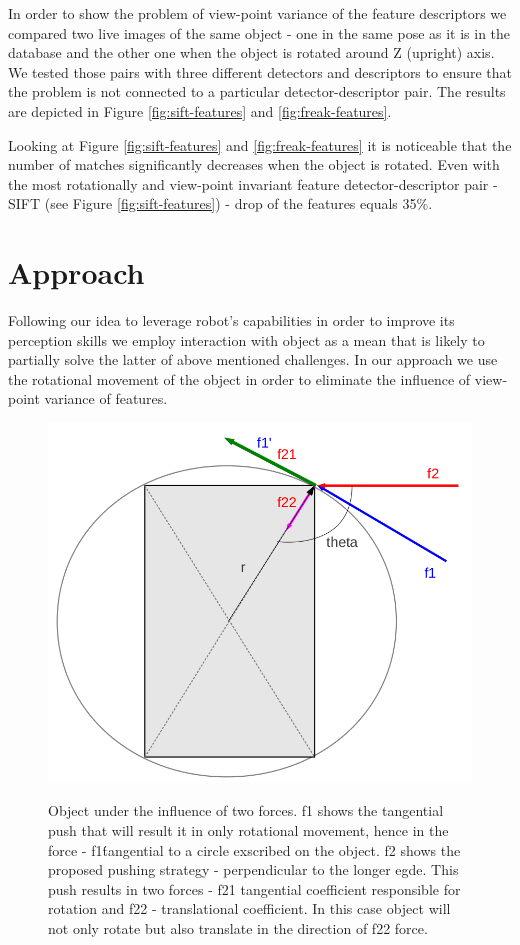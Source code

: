 In order to show the problem of view-point variance of the feature descriptors we compared two live images of the same object - one in the same pose as it is in the database and the other one when the object is rotated around Z (upright) axis. We tested those pairs with three different detectors and descriptors to ensure that the problem is not connected to a particular detector-descriptor pair. The results are depicted in Figure \ref{fig:sift-features} and \ref{fig:freak-features}.%

Looking at Figure \ref{fig:sift-features} and \ref{fig:freak-features} it is noticeable that the number of matches significantly decreases when the object is rotated. Even with the most rotationally and view-point invariant feature detector-descriptor pair - SIFT (see Figure \ref{fig:sift-features}) - drop of the features equals 35$\%$.



\section{Approach}

Following our idea to leverage robot's capabilities in order to improve its perception skills we employ interaction with object as a mean that is likely to partially solve the latter of above mentioned challenges. In our approach we use the rotational movement of the object in order to eliminate the influence of view-point variance of features.

\begin{figure}
\centering 

\includegraphics[width=0.5\columnwidth]{figures/rectangle-angle.png}\\


\caption{Object under the influence of two forces. f1 shows the tangential push that will result it in only rotational movement, hence in the force - f1\' tangential to a circle exscribed on the object. f2 shows the proposed pushing strategy - perpendicular to the longer egde. This push results in two forces - f21 tangential coefficient responsible for rotation and f22 - translational coefficient. In this case object will not only rotate but also translate in the direction of f22 force.  }
\label{fig:angles-rectangle}
\end{figure}


